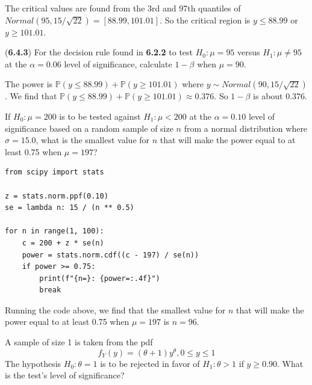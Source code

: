 \documentclass{article}
\renewcommand{\P}{\mathbb{P}}
\begin{document}
\begin{probset}
\begin{prob}
\begin{subprobset}
\begin{subprob}
        \begin{soln}
            The critical values are found from the 3rd and 97th quantiles of $Normal(95, 15/\sqrt{22}) = [88.99, 101.01]$. So the critical region is $y \leq 88.99$ or $y \geq 101.01$.
        \end{soln}
    \end{subprob}

    \begin{subprob}
        (\textbf{6.4.3}) For the decision rule found in \textbf{6.2.2} to test $H_0: \mu = 95$ versus $H_1: \mu \neq 95$ at the $\alpha = 0.06$ level of significance, calculate $1 - \beta$ when $\mu = 90$.

        \begin{soln}
            The power is $\P(y \leq 88.99) + \P(y \geq 101.01)$ where $y \sim Normal(90, 15/\sqrt{22})$. We find that $\P(y \leq 88.99) + \P(y \geq 101.01) \approx 0.376$. So $1 - \beta$ is about 0.376.
        \end{soln}
    \end{subprob}
    \end{subprobset}
\end{prob}

\newpage

\begin{prob}[\textbf{6.4.7}]
    If $H_0: \mu = 200$ is to be tested against $H_1: \mu < 200$ at the $\alpha = 0.10$ level of significance based on a random sample of size $n$ from a normal distribution where $\sigma = 15.0$, what is the smallest value for $n$ that will make the power equal to at least 0.75 when $\mu = 197$?

\begin{verbatim}
from scipy import stats

z = stats.norm.ppf(0.10)
se = lambda n: 15 / (n ** 0.5)

for n in range(1, 100):
    c = 200 + z * se(n)
    power = stats.norm.cdf((c - 197) / se(n))
    if power >= 0.75:
        print(f"{n=}: {power=:.4f}")
        break
\end{verbatim}

    \begin{soln}
        Running the code above, we find that the smallest value for $n$ that will make the power equal to at least 0.75 when $\mu = 197$ is $n = 96$.
    \end{soln}
\end{prob}

\begin{prob}[\textbf{6.4.14}]
    A sample of size 1 is taken from the pdf 
    \[
        f_Y(y) = (\theta + 1)y^\theta, 0 \leq y \leq 1
    \]
    The hypothesis $H_0: \theta = 1$ is to be rejected in favor of $H_1: \theta > 1$ if $y \geq 0.90$. What is the test's level of significance?


\end{prob}
\end{probset}
\end{document}
